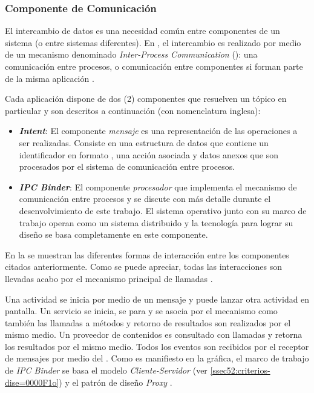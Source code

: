 \subsubsection{Componente de Comunicación}

El intercambio de datos es una necesidad común entre componentes de
un sistema (o entre sistemas diferentes). En \emph{},
el intercambio es realizado por medio de un mecanismo denominado \emph{Inter-Process
Communication} (): una comunicación entre procesos, o comunicación
entre componentes si forman parte de la misma aplicación \cite{Schreiber2011}. 

Cada aplicación dispone de dos (2) componentes que resuelven un tópico
en particular y son descritos a continuación (con nomenclatura inglesa):
\begin{itemize}
\item \textbf{\emph{Intent}}: El componente \emph{mensaje} es una representación
de las operaciones a ser realizadas. Consiste en una estructura de
datos que contiene un identificador en formato , una acción
asociada y datos anexos que son procesados por el sistema de comunicación
entre procesos. 
\item \textbf{\emph{IPC Binder}}: El componente \emph{procesador} que implementa
el mecanismo de comunicación entre procesos \emph{\cite{Schreiber2011}}
y se discute con más detalle durante el desenvolvimiento de este trabajo\emph{.
}El sistema operativo  junto con su marco de trabajo
operan como un sistema distribuido y la tecnología para lograr su
diseño se basa completamente en este componente.
\end{itemize}
En la  se muestran las diferentes formas
de interacción entre los componentes \emph{ }citados
anteriormente. Como se puede apreciar, todas las interacciones son
llevadas acabo por el mecanismo principal de llamadas .

Una actividad se inicia por medio de un mensaje y puede lanzar otra
actividad en pantalla. Un servicio se inicia, se para y se asocia
por el mecanismo  como también las llamadas a métodos y
retorno de resultados son realizados por el mismo medio. Un proveedor
de contenidos es consultado con llamadas  y retorna los
resultados por el mismo medio. Todos los eventos son recibidos por
el receptor de mensajes por medio del . Como es manifiesto
en la gráfica, el marco de trabajo de \emph{IPC Binder} se basa el
modelo \emph{Cliente-Servidor} (ver \ref{ssec52:criterios-dise=0000F1o})
y el patrón de diseño \emph{Proxy} \cite{Shalloway2004}.

